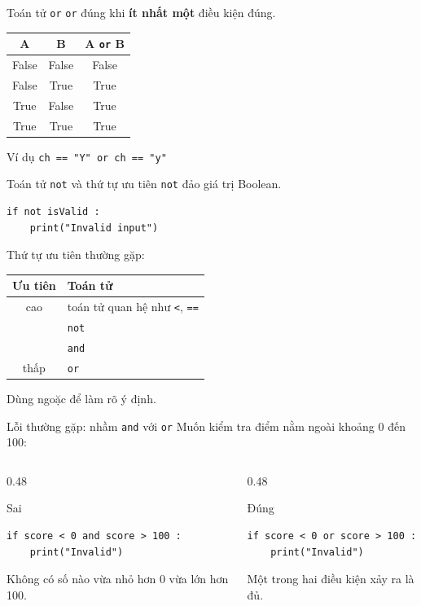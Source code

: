 \documentclass[aspectratio=169,11pt]{beamer}
\newcommand{\code}[1]{\texttt{#1}}
\newcommand{\smallgap}{\vspace{0.4em}}
\begin{document}
\begin{frame}{Toán tử \texttt{or}}
\code{or} đúng khi \textbf{ít nhất một} điều kiện đúng.
\begin{center}
\begin{tabular}{ccc}
\toprule
A & B & A \code{or} B \\
\midrule
False & False & False \\
False & True  & True \\
True  & False & True \\
True  & True  & True \\
\bottomrule
\end{tabular}
\end{center}
\begin{exampleblock}{Ví dụ}
\code{ch == "Y" or ch == "y"}
\end{exampleblock}
\end{frame}

\begin{frame}[fragile]{Toán tử \texttt{not} và thứ tự ưu tiên}
\code{not} đảo giá trị Boolean.
\begin{lstlisting}[style=py]
if not isValid :
    print("Invalid input")
\end{lstlisting}
\smallgap
Thứ tự ưu tiên thường gặp:
\begin{center}
\begin{tabular}{cl}
\toprule
Ưu tiên & Toán tử \\
\midrule
cao & toán tử quan hệ như \code{<}, \code{==} \\
 & \code{not} \\
 & \code{and} \\
thấp & \code{or} \\
\bottomrule
\end{tabular}
\end{center}
Dùng ngoặc để làm rõ ý định.
\end{frame}

\begin{frame}[fragile]{Lỗi thường gặp: nhầm \texttt{and} với \texttt{or}}
Muốn kiểm tra điểm nằm ngoài khoảng 0 đến 100:
\begin{columns}[T]
\begin{column}{0.48\textwidth}
\begin{alertblock}{Sai}
\begin{lstlisting}[style=py]
if score < 0 and score > 100 :
    print("Invalid")
\end{lstlisting}
Không có số nào vừa nhỏ hơn 0 vừa lớn hơn 100.
\end{alertblock}
\end{column}
\begin{column}{0.48\textwidth}
\begin{exampleblock}{Đúng}
\begin{lstlisting}[style=py]
if score < 0 or score > 100 :
    print("Invalid")
\end{lstlisting}
Một trong hai điều kiện xảy ra là đủ.
\end{exampleblock}
\end{column}
\end{columns}
\end{frame}
\end{document}
